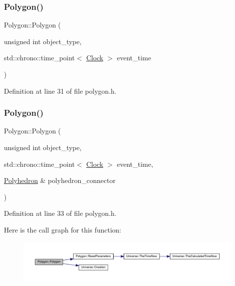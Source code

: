 \subsubsection{\texorpdfstring{Polygon()}{Polygon()}\hspace{0.1cm}{\footnotesize\ttfamily [3/4]}}
{\footnotesize\ttfamily Polygon\+::\+Polygon (\begin{DoxyParamCaption}\item[{unsigned int}]{object\+\_\+type,  }\item[{std\+::chrono\+::time\+\_\+point$<$ \hyperlink{universe_8h_a0ef8d951d1ca5ab3cfaf7ab4c7a6fd80}{Clock} $>$}]{event\+\_\+time }\end{DoxyParamCaption})\hspace{0.3cm}{\ttfamily [inline]}}



Definition at line 31 of file polygon.\+h.

\mbox{\label{class_polygon_a581ad88f80bf40668e6c8b928c908bcb}} 
\subsubsection{\texorpdfstring{Polygon()}{Polygon()}\hspace{0.1cm}{\footnotesize\ttfamily [4/4]}}
{\footnotesize\ttfamily Polygon\+::\+Polygon (\begin{DoxyParamCaption}\item[{unsigned int}]{object\+\_\+type,  }\item[{std\+::chrono\+::time\+\_\+point$<$ \hyperlink{universe_8h_a0ef8d951d1ca5ab3cfaf7ab4c7a6fd80}{Clock} $>$}]{event\+\_\+time,  }\item[{\hyperlink{class_polyhedron}{Polyhedron} \&}]{polyhedron\+\_\+connector }\end{DoxyParamCaption})\hspace{0.3cm}{\ttfamily [inline]}}



Definition at line 33 of file polygon.\+h.

Here is the call graph for this function\+:
\nopagebreak
\begin{figure}[H]
\begin{center}
\leavevmode
\includegraphics[width=350pt]{class_polygon_a581ad88f80bf40668e6c8b928c908bcb_cgraph}
\end{center}
\end{figure}
\mbox{\label{class_polygon_a873f9acee059f717277b6414102dab16}} 
